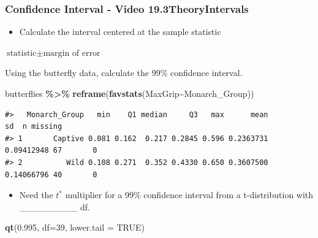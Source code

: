 \documentclass[
]{report}
\newenvironment{Shaded}{\begin{snugshade}}{\end{snugshade}}
\newcommand{\AttributeTok}[1]{\textcolor[rgb]{0.13,0.29,0.53}{#1}}
\newcommand{\ConstantTok}[1]{\textcolor[rgb]{0.56,0.35,0.01}{#1}}
\newcommand{\DecValTok}[1]{\textcolor[rgb]{0.00,0.00,0.81}{#1}}
\newcommand{\FloatTok}[1]{\textcolor[rgb]{0.00,0.00,0.81}{#1}}
\newcommand{\FunctionTok}[1]{\textcolor[rgb]{0.13,0.29,0.53}{\textbf{#1}}}
\newcommand{\NormalTok}[1]{#1}
\newcommand{\SpecialCharTok}[1]{\textcolor[rgb]{0.81,0.36,0.00}{\textbf{#1}}}
\providecommand{\tightlist}{%
  \setlength{\itemsep}{0pt}\setlength{\parskip}{0pt}}
\newcommand{\rgi}{\hspace{24pt}}  %
\begin{document}
\vspace{0.6in}

\subsubsection*{Confidence Interval - Video 19.3TheoryIntervals}\label{confidence-interval---video-19.3theoryintervals}

\begin{itemize}
\tightlist
\item
  Calculate the interval centered at the sample statistic
\end{itemize}

\rgi \(\text{statistic} \pm \text{margin of error}\)

\vspace{0.8in}

Using the butterfly data, calculate the 99\% confidence interval.

\begin{Shaded}
\begin{Highlighting}[]
\NormalTok{butterflies }\SpecialCharTok{\%\textgreater{}\%}
    \FunctionTok{reframe}\NormalTok{(}\FunctionTok{favstats}\NormalTok{(MaxGrip}\SpecialCharTok{\textasciitilde{}}\NormalTok{Monarch\_Group))}
\end{Highlighting}
\end{Shaded}

\begin{verbatim}
#>   Monarch_Group   min    Q1 median     Q3   max      mean         sd  n missing
#> 1       Captive 0.081 0.162  0.217 0.2845 0.596 0.2363731 0.09412948 67       0
#> 2          Wild 0.108 0.271  0.352 0.4330 0.650 0.3607500 0.14066796 40       0
\end{verbatim}

\begin{itemize}
\tightlist
\item
  Need the \(t^*\) multiplier for a 99\% confidence interval from a t-distribution with \_\_\_\_\_\_\_\_\_ df.
\end{itemize}

\begin{Shaded}
\begin{Highlighting}[]
\FunctionTok{qt}\NormalTok{(}\FloatTok{0.995}\NormalTok{, }\AttributeTok{df=}\DecValTok{39}\NormalTok{, }\AttributeTok{lower.tail =} \ConstantTok{TRUE}\NormalTok{)}
\end{Highlighting}
\end{Shaded}
\end{document}
